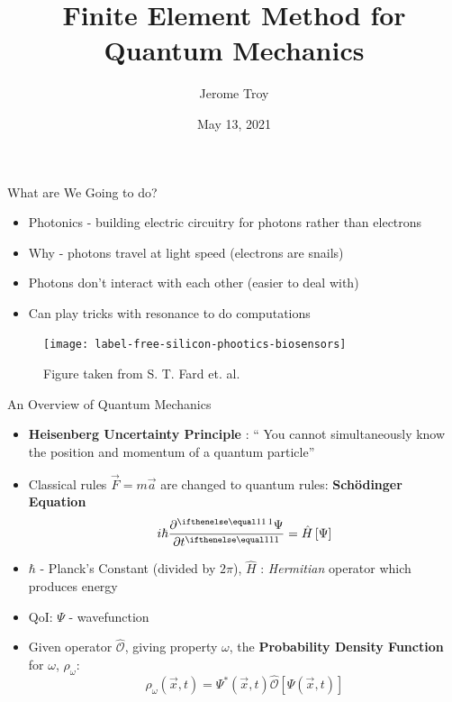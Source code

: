 \documentclass{beamer}
\title[FEM for Quantum]{
		Finite Element Method for Quantum Mechanics
}
\author[J. Troy]{Jerome Troy}
\date{May 13, 2021}
\begin{document}
\begin{frame}
		\titlepage
\end{frame}

\begin{frame}{What are We Going to do?}
\begin{itemize}
		\item Photonics - building electric circuitry for 
				photons rather than electrons
		\item Why - photons travel at light speed (electrons are snails)
		\item Photons don't interact with each other (easier to deal with)
		\item Can play tricks with resonance to do computations
\end{itemize}  

\begin{figure}
\centering
\texttt{[image: label-free-silicon-phootics-biosensors]}
\caption{Figure taken from S. T. Fard et. al.}
\end{figure}

\end{frame}

\begin{frame}{An Overview of Quantum Mechanics}
  \begin{itemize}
  	\item \textbf{Heisenberg Uncertainty Principle} : ``
			You cannot simultaneously know the position and 
			momentum of a quantum particle''
	\item Classical rules $\vec F = m \vec a$ are changed to
			quantum rules: \textbf{Sch\"odinger Equation}
			\[
					i \hbar \pder{\Psi}{t} = \hat H\left[\Psi\right]
			\] 
	\item $\hbar$ - Planck's Constant (divided by $2\pi$), 
			$\hat H$ : \textit{Hermitian} operator which produces energy
	\item QoI: $\Psi$ - wavefunction
	\item Given operator $\hat{\mathcal O}$, giving property $\omega$, 
			the \textbf{Probability Density Function} for $\omega$,
			$\rho_\omega$:
			\[
					\rho_\omega(\vec x, t) = \Psi^*(\vec x, t) 
					\hat{\mathcal O}\left[\Psi(\vec x, t)\right] 
			\] 
  \end{itemize}
\end{frame}
\end{document}

